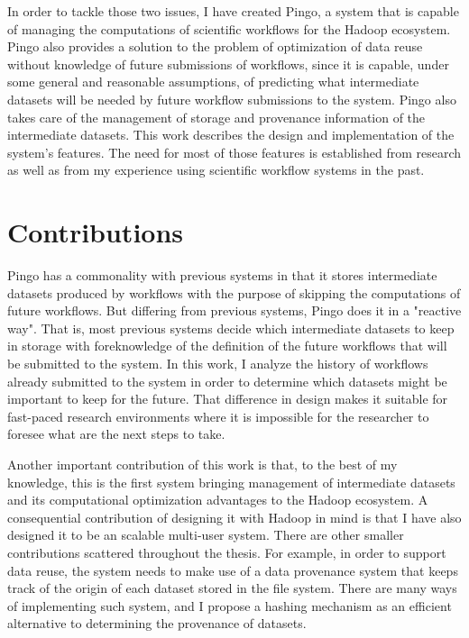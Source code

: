 In order to tackle those two issues, I have created Pingo, a system that is capable of managing the computations of scientific workflows for the Hadoop ecosystem. Pingo also provides a solution to the problem of optimization of data reuse without knowledge of future submissions of workflows, since it is capable, under some general and reasonable assumptions, of predicting what intermediate datasets will be needed by future workflow submissions to the system. Pingo also takes care of the management of storage and provenance information of the intermediate datasets. This work describes the design and implementation of the system's features.  The need for most of those features is established from research as well as from my experience using scientific workflow systems in the past. 

\section{Contributions}
Pingo has a commonality with previous systems \citep{altintas2004kepler, yuan2012data, deelman2015pegasus} in that it stores intermediate datasets produced by workflows with the purpose of skipping the computations of future workflows. But differing from previous systems, Pingo does it in a "reactive way".  That is, most previous systems decide which intermediate datasets to keep in storage with foreknowledge of the definition of the future workflows that will be submitted to the system.  In this work, I analyze the history of workflows already submitted to the system in order to determine which datasets might be important to keep for the future. That difference in design makes it suitable for fast-paced research environments where it is impossible for the researcher to foresee what are the next steps to take.

Another important contribution of this work is that, to the best of my knowledge, this is the first system bringing management of intermediate datasets and its computational optimization advantages to the Hadoop ecosystem.  A consequential contribution of designing it with Hadoop in mind is that I have also designed it to be an scalable multi-user system.  There are other smaller contributions scattered throughout the thesis. For example, in order to support data reuse, the system needs to make use of a data provenance system that keeps track of the origin of each dataset stored in the file system. There are many ways of implementing such system, and I propose a hashing mechanism as an efficient alternative to determining the provenance of datasets.  

